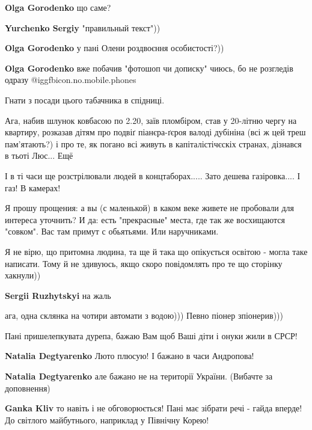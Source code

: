 \begin{itemize}
\begin{itemize} %
\textbf{Olga Gorodenko} що саме?

\textbf{Yurchenko Sergiy} "правильный текст"))

\textbf{Olga Gorodenko} у пані Олени роздвоєння особистості?))

\textbf{Olga Gorodenko} вже побачив "фотошоп чи дописку" чиюсь, бо не розгледів одразу  @igg{fbicon.no.mobile.phones} 
\end{itemize} %

 
Гнати з посади цього табачника в спідниці.

Ага, набив шлунок ковбасою по 2.20, заїв пломбіром, став у 20-літню чергу на квартиру, розказав дітям про подвіґ піанєра-ґєроя валоді дубініна (всі ж цей треш пам'ятають?) і про те, як погано всі живуть в капіталістічєскіх странах, дізнався в тьоті Люс... Ещё

І в ті часи ще розстрілювали людей в концтаборах..... Зато дешева газіровка.... І газ! В камерах!

Я прошу прощения: а вы (с маленькой) в каком веке живете не пробовали для интереса уточнить?
И да: есть "прекрасные" места, где так же восхищаются "совком". Вас там примут с обьятьями.
Или наручниками.

Я не вірю, що притомна людина, та ще й така що опікується освітою - могла таке написати. Тому й не здивуюсь, якщо скоро повідомлять про те що сторінку хакнули))

\textbf{Sergii Ruzhytskyi} на жаль

ага, одна склянка на чотири автомати з водою))) Певно піонер зпіонерив)))

Пані пришелепкувата дурепа, бажаю Вам щоб Ваші діти і онуки жили в СРСР!

\begin{itemize} %
\textbf{Natalia Degtyarenko}
Люто плюсую!
І бажано в часи Андропова!

\textbf{Natalia Degtyarenko} але бажано не на території України. (Вибачте за доповнення)

\textbf{Ganka Kliv} то навіть і не обговорюється! Пані має зібрати речі - гайда вперде! До світлого майбутнього, наприклад у Північну Корею!
\end{itemize} %


\end{itemize} %
